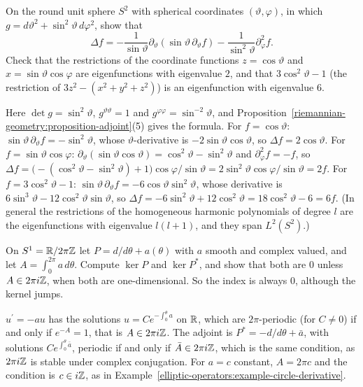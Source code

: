 \begin{exercise}\label{elliptic-operators:exercise-spherical-harmonics}
On the round unit sphere $S^2$ with spherical coordinates $(\vartheta, \varphi)$, in which $g = d\vartheta^2 + \sin^2\vartheta\,d\varphi^2$, show that
\[
\Delta f = -\frac{1}{\sin\vartheta}\partial_\vartheta(\sin\vartheta\,\partial_\vartheta f) - \frac{1}{\sin^2\vartheta}\partial_\varphi^2f .
\]
Check that the restrictions of the coordinate functions $z = \cos\vartheta$ and $x = \sin\vartheta\cos\varphi$ are eigenfunctions with eigenvalue $2$, and that $3\cos^2\vartheta - 1$ (the restriction of
$3z^2 - (x^2 + y^2 + z^2)$) is an eigenfunction with eigenvalue $6$.
\end{exercise}

\begin{solution}
Here $\det g = \sin^2\vartheta$, $g^{\vartheta\vartheta} = 1$ and $g^{\varphi\varphi} = \sin^{-2}\vartheta$, and Proposition~\ref{riemannian-geometry:proposition-adjoint}(5) gives the formula. For $f = \cos\vartheta$:
$\sin\vartheta\,\partial_\vartheta f = -\sin^2\vartheta$, whose $\vartheta$-derivative is $-2\sin\vartheta\cos\vartheta$, so $\Delta f = 2\cos\vartheta$. For $f = \sin\vartheta\cos\varphi$:
$\partial_\vartheta(\sin\vartheta\cos\vartheta) = \cos^2\vartheta - \sin^2\vartheta$ and $\partial_\varphi^2f = -f$, so
$\Delta f = \bigl(-(\cos^2\vartheta - \sin^2\vartheta) + 1\bigr)\cos\varphi/\sin\vartheta = 2\sin^2\vartheta\cos\varphi/\sin\vartheta = 2f$. For $f = 3\cos^2\vartheta - 1$: $\sin\vartheta\,\partial_\vartheta f = -6\cos\vartheta\sin^2\vartheta$,
whose derivative is $6\sin^3\vartheta - 12\cos^2\vartheta\sin\vartheta$, so $\Delta f = -6\sin^2\vartheta + 12\cos^2\vartheta = 18\cos^2\vartheta - 6 = 6f$. (In general the restrictions of the homogeneous harmonic
polynomials of degree $l$ are the eigenfunctions with eigenvalue $l(l + 1)$, and they span $L^2(S^2)$.)
\end{solution}

\begin{exercise}\label{elliptic-operators:exercise-first-order-circle}
On $S^1 = \mathbb{R}/2\pi\mathbb{Z}$ let $P = d/d\theta + a(\theta)$ with $a$ smooth and complex valued, and let $A = \int_0^{2\pi}a\,d\theta$. Compute $\ker P$ and $\ker P^*$, and show that both are $0$ unless $A \in 2\pi i\mathbb{Z}$, when
both are one-dimensional. So the index is always $0$, although the kernel jumps.
\end{exercise}

\begin{solution}
$u^{\prime} = -au$ has the solutions $u = Ce^{-\int_0^\theta a}$ on $\mathbb{R}$, which are $2\pi$-periodic (for $C \neq 0$) if and only if $e^{-A} = 1$, that is $A \in 2\pi i\mathbb{Z}$. The adjoint is $P^* = -d/d\theta + \bar a$, with
solutions $Ce^{\int_0^\theta\bar a}$, periodic if and only if $\bar A \in 2\pi i\mathbb{Z}$, which is the same condition, as $2\pi i\mathbb{Z}$ is stable under complex conjugation. For
$a = c$ constant, $A = 2\pi c$ and the condition is $c \in i\mathbb{Z}$, as in Example~\ref{elliptic-operators:example-circle-derivative}.
\end{solution}

